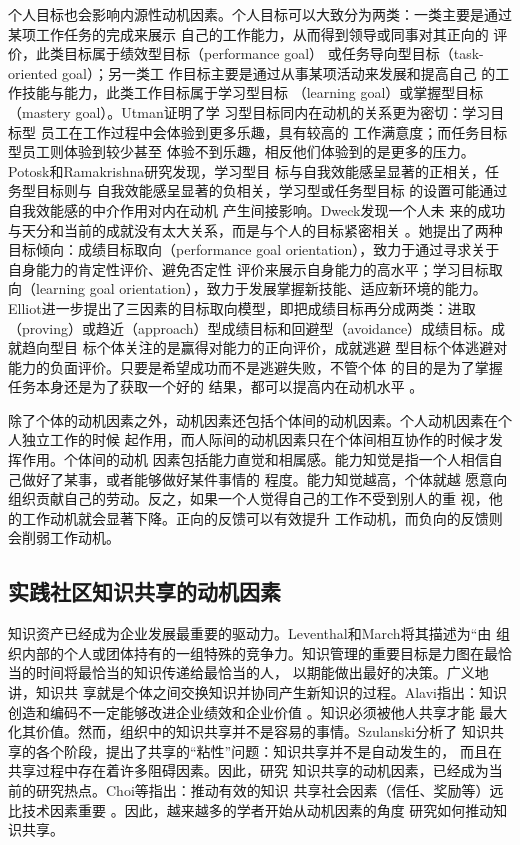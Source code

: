 \documentclass[12pt,a4paper]{ctexart}
\begin{document}
个人目标也会影响内源性动机因素。个人目标可以大致分为两类：一类主要是通过某项工作任务的完成来展示
自己的工作能力，从而得到领导或同事对其正向的
评价，此类目标属于绩效型目标（performance goal）
或任务导向型目标（task-oriented goal）；另一类工
作目标主要是通过从事某项活动来发展和提高自己
的工作技能与能力，此类工作目标属于学习型目标
（learning goal）或掌握型目标（mastery
goal）\cite{LairdJRawsthorne11011999}\cite{Pajares2000}。Utman证明了学
习型目标同内在动机的关系更为密切：学习目标型
员工在工作过程中会体验到更多乐趣，具有较高的
工作满意度；而任务目标型员工则体验到较少甚至
体验不到乐趣，相反他们体验到的是更多的压力\cite{ChristopherHUtman05011997}。Potosk和Ramakrishna研究发现，学习型目
标与自我效能感呈显著的正相关，任务型目标则与
自我效能感呈显著的负相关，学习型或任务型目标
的设置可能通过自我效能感的中介作用对内在动机
产生间接影响\cite{potosky2002mru}。Dweck发现一个人未
来的成功与天分和当前的成就没有太大关系，而是与个人的目标紧密相关
\cite{dweck2000stt}。她提出了两种目标倾向：成绩目标取向（performance
goal orientation），致力于通过寻求关于自身能力的肯定性评价、避免否定性
评价来展示自身能力的高水平；学习目标取向（learning goal
orientation），致力于发展掌握新技能、适应新环境的能力。Elliot进一步提出了三因素的目标取向模型，即把成绩目标再分成两类：进取（proving）或趋近（approach）型成绩目标和回避型（avoidance）成绩目标\cite{elliot1996aaa}。成就趋向型目
标个体关注的是赢得对能力的正向评价，成就逃避
型目标个体逃避对能力的负面评价。只要是希望成功而不是逃避失败，不管个体
的目的是为了掌握任务本身还是为了获取一个好的
结果，都可以提高内在动机水平 。

除了个体的动机因素之外，动机因素还包括个体间的动机因素\cite{Hackman1975}\cite{Hackman1980}。个人动机因素在个人独立工作的时候
起作用，而人际间的动机因素只在个体间相互协作的时候才发挥作用。个体间的动机
因素包括能力直觉和相属感。能力知觉是指一个人相信自己做好了某事，或者能够做好某件事情的
程度\cite{harter1981nsr}\cite{bandura1982sem}。能力知觉越高，个体就越
愿意向组织贡献自己的劳动。反之，如果一个人觉得自己的工作不受到别人的重
视，他的工作动机就会显著下降\cite{Hertel2003}。正向的反馈可以有效提升
工作动机，而负向的反馈则会削弱工作动机。


\subsection{实践社区知识共享的动机因素}


知识资产已经成为企业发展最重要的驱动力。Leventhal和March将其描述为“由
组织内部的个人或团体持有的一组特殊的竞争力\cite{levinthal1993ml}。知识管理的重要目标是力图在最恰当的时间将最恰当的知识传递给最恰当的人，
以期能做出最好的决策\cite{Petrash1996}。广义地讲，知识共
享就是个体之间交换知识并协同产生新知识的过程。Alavi指出：知识创造和编码不一定能够改进企业绩效和企业价值
\cite{alavi2000mok}。知识必须被他人共享才能
最大化其价值。然而，组织中的知识共享并不是容易的事情。Szulanski分析了
知识共享的各个阶段，提出了共享的“粘性”问题：知识共享并不是自动发生的，
而且在共享过程中存在着许多阻碍因素\cite{szulanski2000pkt}。因此，研究
知识共享的动机因素，已经成为当前的研究热点。Choi等指出：推动有效的知识
共享社会因素（信任、奖励等）远比技术因素重要
\cite{SueYoungChoi10012008}。因此，越来越多的学者开始从动机因素的角度
研究如何推动知识共享。
\end{document}
